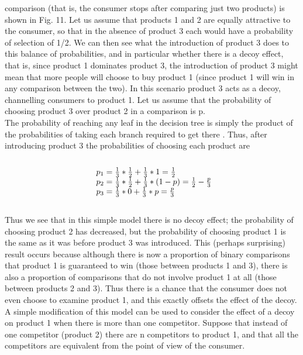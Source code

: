 comparison (that is, the consumer stops after comparing just two products) is shown in Fig. 11.
Let us assume that products 1 and 2 are equally attractive to the consumer, so that in the absence of
product 3 each would have a probability of selection of 1/2. We can then see what the introduction of
product 3 does to this balance of probabilities, and in particular whether there is a decoy effect,
that is, since product 1 dominates product 3, the introduction of product 3 might mean that more people
will choose to buy product 1 (since product 1 will win in any comparison between the two). In this scenario
product 3 acts as a decoy, channelling consumers to product 1. Let us assume that the probability of choosing
product 3 over product 2 in a comparison is p.\\
The probability of reaching any leaf in the decision tree is simply the product of the probabilities of
taking each branch required to get there    . Thus, after introducing product 3 the probabilities of choosing each product are\\
\\
\begin{equation} \label{eq:12}
\begin{array}{l@{}l}
p_1 = \frac{1}{3}*\frac{1}{2}+\frac{1}{3}*1 = \frac{1}{2} \\
p_2 = \frac{1}{3}*\frac{1}{2}+\frac{1}{3}*(1-p) = \frac{1}{2} - \frac{p}{3} \\
p_3 = \frac{1}{3}*0+\frac{1}{3}*p = \frac{p}{3}
\end{array}
\end{equation}
\\
Thus we see that in this simple model there is no decoy effect; the probability of choosing product 2 has decreased,
but the probability of choosing product 1 is the same as it was before product 3 was introduced.
This (perhaps surprising) result occurs because although there is now a proportion of binary comparisons
that product 1 is guaranteed to win (those between products 1 and 3), there is also a proportion of comparisons
that do not involve product 1 at all (those between products 2 and 3). Thus there is a chance that the consumer
does not even choose to examine product 1, and this exactly offsets the effect of the decoy.
A simple modification of this model can be used to consider the effect of a decoy on product 1 when
there is more than one competitor. Suppose that instead of one competitor (product 2) there are n competitors
to product 1, and that all the competitors are equivalent from the point of view of the consumer.
